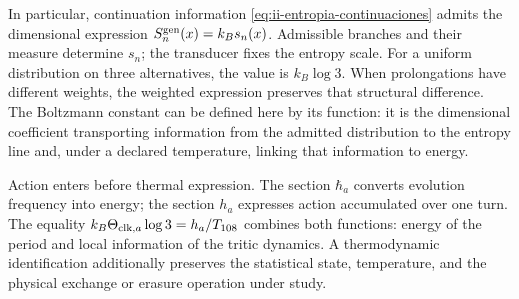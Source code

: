 In particular, continuation information
\eqref{eq:ii-entropia-continuaciones} admits the dimensional expression
\(S_n^{\rm gen}(x)=k_Bs_n(x)\). Admissible branches and their measure
determine \(s_n\); the transducer fixes the entropy scale. For
a uniform distribution on three alternatives, the value is
\(k_B\log3\). When prolongations have different weights,
the weighted expression preserves that structural difference. The
Boltzmann constant can be defined here by its function: it is the
dimensional coefficient transporting information from the
admitted distribution to the entropy line and, under a declared
temperature, linking that information to energy.

Action enters before thermal expression. The section
\(\hbar_a\) converts evolution frequency into energy;
the section \(h_a\) expresses action accumulated over one turn.
The equality \(k_B\Theta_{{\rm clk},a}\log3=h_a/T_{108}\)
combines both functions: energy of the period and local information of
the tritic dynamics. A thermodynamic identification additionally preserves
the statistical state, temperature, and the physical exchange
or erasure operation under study.
